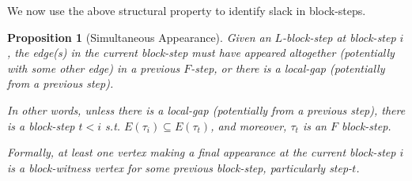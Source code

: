 \documentclass[12pt]{article}
\newtheorem{proposition}[theorem]{Proposition}
\begin{document}
We now use the above structural property to identify slack in block-steps.

\begin{proposition}[Simultaneous Appearance] \label{prop:simultaneous-appearance} Given an $L$-block-step at block-step $i$, the edge(s) in the current block-step must have appeared altogether (potentially with some other edge) in a previous $F$-step, or there is a local-gap (potentially from a previous step).

 In other words, unless there is a local-gap (potentially from a previous step), there is a block-step $t<i$ s.t. $E(\tau_i) \subseteq E(\tau_t)$, and moreover, $\tau_t$ is an $F$ block-step.
 
 Formally, at least one vertex making a final appearance at the current block-step $i$ is a block-witness vertex for some previous block-step, particularly step-$t$.
\end{proposition}


%
\end{document}
